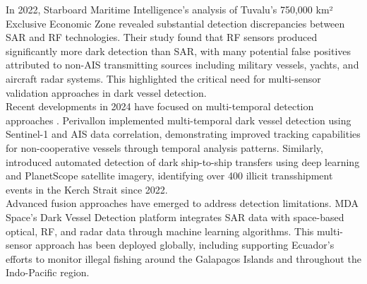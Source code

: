 \documentclass{article}
\begin{document}
	In 2022, \cite{GablerKoch_DetectionNonCooperativeVessels_2025} Starboard Maritime Intelligence's analysis of Tuvalu's 750,000 km² Exclusive Economic Zone revealed substantial detection discrepancies between SAR and RF technologies. Their study found that RF sensors produced significantly more dark detection than SAR, with many potential false positives attributed to non-AIS transmitting sources including military vessels, yachts, and aircraft radar systems. This highlighted the critical need for multi-sensor validation approaches in dark vessel detection. \\
	
	Recent developments in 2024 have focused on multi-temporal detection approaches \cite{Author_2024_DarkShipToShip}. Perivallon implemented multi-temporal dark vessel detection using Sentinel-1 and AIS data correlation, demonstrating improved tracking capabilities for non-cooperative vessels through temporal analysis patterns. Similarly, \cite{PERIVALLON_DarkVesselDetection_2025} introduced automated detection of dark ship-to-ship transfers using deep learning and PlanetScope satellite imagery, identifying over 400 illicit transshipment events in the Kerch Strait since 2022.\\
	
	Advanced fusion approaches have emerged to address detection limitations. \cite{MDASpace_DarkVesselDetection} MDA Space's Dark Vessel Detection platform integrates SAR data with space-based optical, RF, and radar data through machine learning algorithms. This multi-sensor approach has been deployed globally, including supporting Ecuador's efforts to monitor illegal fishing around the Galapagos Islands and throughout the Indo-Pacific region.
	
\end{document}
